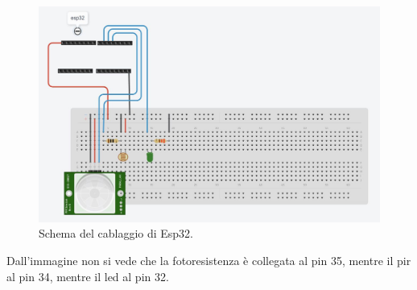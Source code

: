 \documentclass[a4paper,12pt]{report}
\begin{document}
\begin{figure}[H]
\centering
\includegraphics[width=\textwidth]{img/wire-esp.jpeg}
\caption{Schema del cablaggio di Esp32.}
\label{fig:wiringsesp}
\end{figure}

Dall'immagine non si vede che la fotoresistenza è collegata al pin 35, mentre il pir al pin 34, mentre il led al pin 32.
\end{document}
